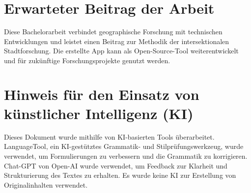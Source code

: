 \documentclass{template}
\begin{document}
\section{Erwarteter Beitrag der Arbeit}
Diese Bachelorarbeit verbindet geographische Forschung mit technischen Entwicklungen und leistet einen Beitrag zur Methodik der intersektionalen Stadtforschung. Die erstellte App kann als Open-Source-Tool weiterentwickelt und für zukünftige Forschungsprojekte genutzt werden.

\newpage
\PrintBib

\section*{Hinweis für den Einsatz von künstlicher Intelligenz (KI)}

Dieses Dokument wurde mithilfe von KI-basierten Tools überarbeitet. LanguageTool, ein KI-gestütztes Grammatik- und Stilprüfungswerkzeug, wurde verwendet, um Formulierungen zu verbessern und die Grammatik zu korrigieren. Chat-GPT von Open-AI wurde verwendet, um Feedback zur Klarheit und Strukturierung des Textes zu erhalten. Es wurde keine KI zur Erstellung von Originalinhalten verwendet.
\end{document}
